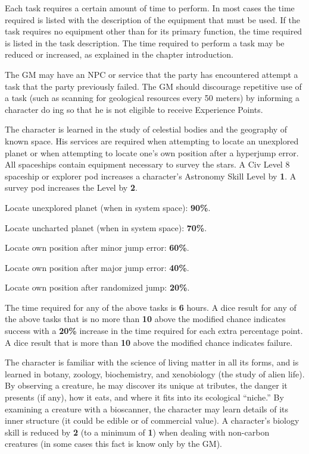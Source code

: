 Each task requires a certain amount of time to perform.  In most cases
the time required is listed with the description of the equipment
that must be used.  If the task requires no equipment other than for
its primary function, the time required is listed in the task
description.  The time required to perform a task may be reduced or
increased, as explained in the chapter introduction.

The GM may have an NPC or service that the party has encountered
attempt a task that the party previously failed.  The GM should
discourage repetitive use of a task (such as scanning for geological
resources every 50 meters) by informing a character do ing so that he
is not eligible to receive Experience Points.

\label{sec:skill-astronomy}

The character is learned in the study of celestial bodies and the
geography of known space.  His services are required when attempting
to locate an unexplored planet or when attempting to locate one's own
position after a hyperjump error.  All spaceships contain equipment
necessary to survey the stars.  A Civ Level 8 spaceship or explorer pod
increases a character's Astronomy Skill Level by \textbf{1}.  A survey
pod increases the Level by \textbf{2}.

\begin{tasklist}
\item Locate unexplored planet (when in system space): \textbf{90\%}.
\item Locate uncharted planet (when in system space): \textbf{70\%}.
\item Locate own position after minor jump error: \textbf{60\%}.
\item Locate own position after major jump error: \textbf{40\%}.
\item Locate own position after randomized  jump: \textbf{20\%}.
\end{tasklist}

The time required for any of the above tasks is \textbf{6} hours.  A
dice result for any of the above tasks that is no more than
\textbf{10} above the modified chance indicates success with a
\textbf{20\%} increase in the time required for each extra percentage
point.  A dice result that is more than \textbf{10} above the modified
chance indicates failure.

\label{sec:skill-biology}

The character is familiar with the science of living matter in all its
forms, and is learned in botany, zoology, biochemistry, and
xenobiology (the study of alien life).  By observing a creature, he
may discover its unique at tributes, the danger it presents (if any),
how it eats, and where it fits into its ecological ``niche.'' By
examining a creature with a bioscanner, the character may learn
details of its inner structure (it could be edible or of commercial
value).  A character's biology skill is reduced by \textbf{2} (to a
minimum of \textbf{1}) when dealing with non-carbon creatures (in some
cases this fact is know only by the GM).

